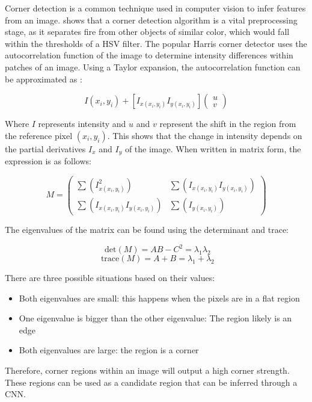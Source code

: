 \documentclass[lettersize,journal]{IEEEtran}
\begin{document}
Corner detection is a common technique used in computer vision to infer
features from an image. \cite{prepfire} shows that a corner detection
algorithm is a vital preprocessing stage, as it separates fire from
other objects of similar color, which would fall within the thresholds
of a HSV filter. The popular Harris corner detector uses the
autocorrelation function of the image to determine intensity differences
within patches of an image. Using a Taylor expansion, the
autocorrelation function can be approximated as
\cite{prepfire}\cite{harriscorner}:

\[I\left( x_{i},y_{i} \right) + \left\lbrack I_{x\left( x_{i},y_{i} \right)}I_{y\left( x_{i},y_{i} \right)} \right\rbrack\begin{pmatrix}
u \\
v
\end{pmatrix}\]

Where \(I\) represents intensity and \(u\) and \(v\) represent the shift
in the region from the reference pixel \(\left( x_{i},y_{i} \right)\).
This shows that the change in intensity depends on the partial
derivatives \(I_{x}\) and \(I_{y}\) of the image. When written in matrix
form, the expression is as follows:

\[M = \begin{pmatrix}
\sum(I_{x\left( x_{i},y_{i} \right)}^{2}) & \sum(I_{x\left( x_{i},y_{i} \right)}I_{y\left( x_{i},y_{i} \right)}) \\
\sum(I_{x\left( x_{i},y_{i} \right)}I_{y\left( x_{i},y_{i} \right)}) & \sum(I_{y\left( x_{i},y_{i} \right)})
\end{pmatrix}\]

The eigenvalues of the matrix can be found using the determinant and
trace:

\[\text{ det}(M) = AB - C^{2} = \lambda_{1}\lambda_{2}\]
\[\text{ trace}(M) = A + B = \lambda_{1} + \lambda_{2}\]

There are three possible situations based on their values:

\begin{itemize}
\item
  Both eigenvalues are small: this happens when the pixels are in a flat
  region
\item
  One eigenvalue is bigger than the other eigenvalue: The region likely
  is an edge
\item
  Both eigenvalues are large: the region is a corner
\end{itemize}

Therefore, corner regions within an image will output a high corner
strength. These regions can be used as a candidate region that can be
inferred through a CNN.
\end{document}
